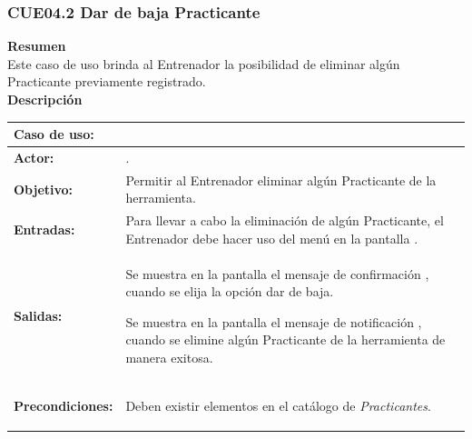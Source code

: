 \subsubsection{CUE04.2 Dar de baja Practicante}
\label{cu:CUE04.2}

\textbf{\textcolor[rgb]{0, 0, 0.545098}{Resumen}} \\

Este caso de uso brinda al Entrenador la posibilidad de eliminar algún Practicante previamente registrado.\\

\textbf{\textcolor[rgb]{0, 0, 0.545098}{Descripción}}

\begin{table}[H]
\centering
\begin{tabular}{| l | p{12 cm} |}
\hline
\rowcolor[rgb]{0.529412, 0.807843, 0.980392} {\textbf{Caso de uso:}} & \hspace{7em}{\textbf{CUE04.2 Dar de baja Practicante}}\\
\hline
\textbf{Actor:} &  \nameref{act:Entrenador}. \\
\hline
\textbf{Objetivo:} & Permitir al Entrenador eliminar algún Practicante de la herramienta.\\
\hline
\textbf{Entradas:} & Para llevar a cabo la eliminación de algún Practicante, el Entrenador debe hacer uso del menú \nameref{menu:ME04} en la pantalla \nameref{pant:IUE04}.\\
\hline
\textbf{Salidas:} & \vspace{-2mm}	%
					\begin{compactitem}
						\setlength\itemsep{-0.25em}
						\item Se muestra en la pantalla \nameref{pant:IUE04} el mensaje de confirmación \nameref{msj:MSG05}, cuando se elija la opción dar de baja.
						\item Se muestra en la pantalla \nameref{pant:IUE04} el mensaje de notificación \nameref{msj:MSG01}, cuando se elimine algún Practicante de la herramienta de manera exitosa.
					\end{compactitem}\\
\hline
\textbf{Precondiciones:} & 	\vspace{-2mm}	%
							\begin{compactitem}
								\setlength\itemsep{-0.25em}
								\item Deben existir elementos en el catálogo de \textit{Practicantes}.
							\end{compactitem}\\

\end{tabular}
\end{table}
